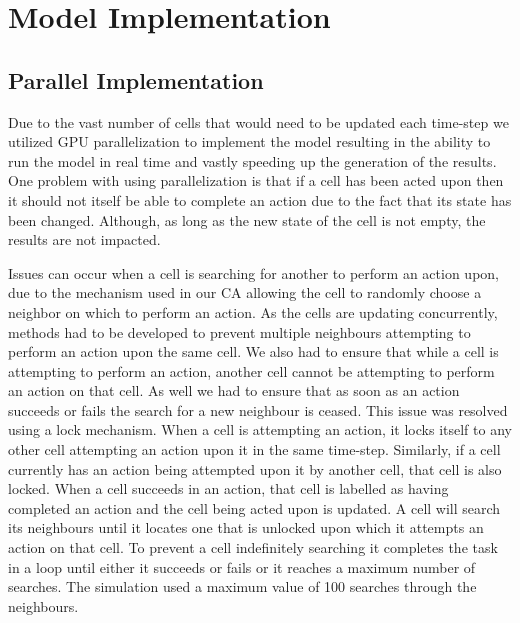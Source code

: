 \documentclass[\main/thesis.tex]{subfiles}
\begin{document}
\section{Model Implementation}

\subsection{Parallel Implementation}
Due to the vast number of cells that would need to be updated each time-step we utilized GPU parallelization to implement the model resulting in the ability to run the model in real time and vastly speeding up the generation of the results. One problem with using parallelization is that if a cell has been acted upon then it should not itself be able to complete an action due to the fact that its state has been changed. Although, as long as the new state of the cell is not empty, the results are not impacted.

Issues can occur when a cell is searching for another to perform an action upon, due to the mechanism used in our CA allowing the cell to randomly choose a neighbor on which to perform an action. As the cells are updating concurrently, methods had to be developed to prevent multiple neighbours attempting to perform an action upon the same cell. We also had to ensure that while a cell is attempting to perform an action, another cell cannot be attempting to perform an action on that cell. As well we had to ensure that as soon as an action succeeds or fails the search for a new neighbour is ceased. This issue was resolved using a lock mechanism. When a cell is attempting an action, it locks itself to any other cell attempting an action upon it in the same time-step. Similarly, if a cell currently has an action being attempted upon it by another cell, that cell is also locked. When a cell succeeds in an action, that cell is labelled as having completed an action and the cell being acted upon is updated. A cell will search its neighbours until it locates one that is unlocked upon which it attempts an action on that cell. To prevent a cell indefinitely searching it completes the task in a loop until either it succeeds or fails or it reaches a maximum number of searches. The simulation used a maximum value of 100 searches through the neighbours.
\end{document}
